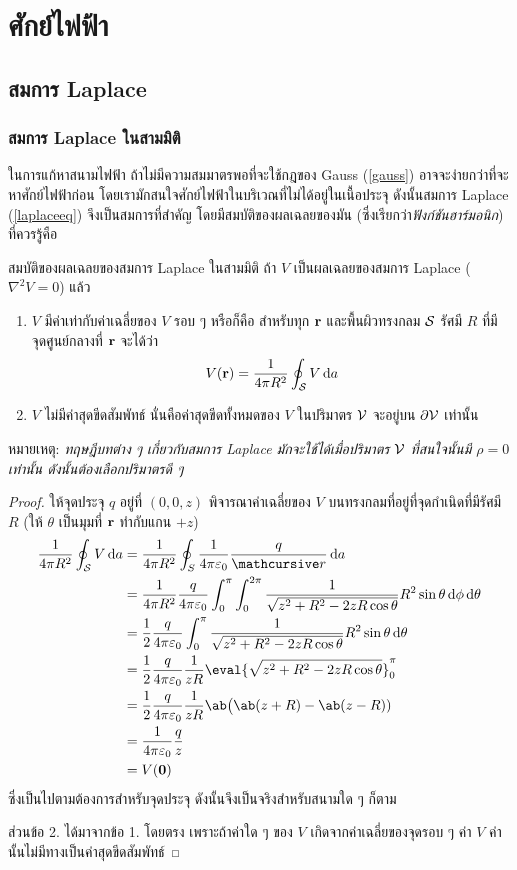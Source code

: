 \chapter{ศักย์ไฟฟ้า}
\section{สมการ Laplace}
\subsection{สมการ Laplace ในสามมิติ}
ในการแก้หาสนามไฟฟ้า ถ้าไม่มีความสมมาตรพอที่จะใช้กฎของ Gauss (\ref{gauss}) อาจจะง่ายกว่าที่จะหาศักย์ไฟฟ้าก่อน โดยเรามักสนใจศักย์ไฟฟ้าในบริเวณที่ไม่ได้อยู่ในเนื้อประจุ ดังนั้นสมการ Laplace (\ref{laplaceeq}) จึงเป็นสมการที่สำคัญ โดยมีสมบัติของผลเฉลยของมัน (ซึ่งเรียกว่า\emph{ฟังก์ชันฮาร์มอนิก}) ที่ควรรู้คือ
\begin{lawbox}{สมบัติของผลเฉลยของสมการ Laplace ในสามมิติ}
    ถ้า $V$ เป็นผลเฉลยของสมการ Laplace ($\nabla^2V=0$) แล้ว
    \begin{enumerate}
        \item $V$ มีค่าเท่ากับค่าเฉลี่ยของ $V$ รอบ ๆ หรือก็คือ สำหรับทุก $\mathbf{r}$ และพื้นผิวทรงกลม $\mathcal{S}$ รัศมี $R$ ที่มีจุดศูนย์กลางที่ $\mathbf{r}$ จะได้ว่า
        \begin{equation}
            V(\vb{r})=\frac{1}{4\pi R^2}\oint_\sur V\odif{a}
        \end{equation}
        \item $V$ ไม่มีค่าสุดขีดสัมพัทธ์ นั่นคือค่าสุดขีดทั้งหมดของ $V$ ในปริมาตร $\mathcal{V}$ จะอยู่บน $\partial\mathcal{V}$ เท่านั้น
    \end{enumerate}
\end{lawbox}
หมายเหตุ: \emph{ทฤษฎีบทต่าง ๆ เกี่ยวกับสมการ Laplace มักจะใช้ได้เมื่อปริมาตร $\mathcal{V}$ ที่สนใจนั้นมี $\rho=0$ เท่านั้น ดังนั้นต้องเลือกปริมาตรดี ๆ}
\begin{proof}
    ให้จุดประจุ $q$ อยู่ที่ $(0,0,z)$ พิจารณาค่าเฉลี่ยของ $V$ บนทรงกลมที่อยู่ที่จุดกำเนิดที่มีรัศมี $R$ (ให้ $\theta$ เป็นมุมที่ $\mathbf{r}$ ทำกับแกน $+z$)
    {\allowdisplaybreaks
    \begin{align*}
        \frac{1}{4\pi R^2}\oint_\sur V\odif{a}&=\frac{1}{4\pi R^2}\oint_S\kem\frac{q}{\rad}\odif{a}\\
        &=\frac{1}{4\pi R^2}\frac{q}{4\pi\eps_0}\int_0^\pi\int_0^{2\pi}\frac{1}{\sqrt{z^2+R^2-2zR\cos\theta}}R^2\sin\theta\odif{\phi}\odif{\theta}\\
        &=\frac{1}{2}\frac{q}{4\pi\eps_0}\int_0^\pi\frac{1}{\sqrt{z^2+R^2-2zR\cos\theta}}R^2\sin\theta\odif{\theta}\\
        &=\frac{1}{2}\frac{q}{4\pi\eps_0}\frac{1}{zR}\eval{\sqrt{z^2+R^2-2zR\cos\theta}}_0^\pi\\
        &=\frac{1}{2}\frac{q}{4\pi\eps_0}\frac{1}{zR}\ab\big(\ab(z+R)-\ab(z-R))\\
        &=\kem\frac{q}{z}\\
        &=V(\vb{0})
    \end{align*}
    }
    ซึ่งเป็นไปตามต้องการสำหรับจุดประจุ ดังนั้นจึงเป็นจริงสำหรับสนามใด ๆ ก็ตาม
    
    ส่วนข้อ 2. ได้มาจากข้อ 1. โดยตรง เพราะถ้าค่าใด ๆ ของ $V$ เกิดจากค่าเฉลี่ยของจุดรอบ ๆ ค่า $V$ ค่านั้นไม่มีทางเป็นค่าสุดขีดสัมพัทธ์
\end{proof}
